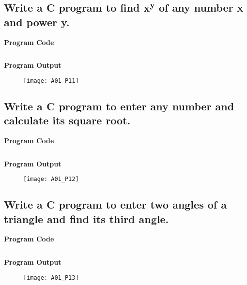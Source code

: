 \newpage



\subsection{Write a C program to find x\textsuperscript{y} of any number x and power y.}
\textbf{Program Code}

\inputminted{C}{programs/A01_P11.c}

\textbf{Program Output}

\begin{figure}[h]
  \texttt{[image: A01\_P11]}
\end{figure}

\newpage



\subsection{Write a C program to enter any number and calculate its square root.}
\textbf{Program Code}

\inputminted{C}{programs/A01_P12.c}

\textbf{Program Output}

\begin{figure}[h]
  \texttt{[image: A01\_P12]}
\end{figure}

\newpage



\subsection{Write a C program to enter two angles of a triangle and find its third angle.}
\textbf{Program Code}

\inputminted{C}{programs/A01_P13.c}

\textbf{Program Output}

\begin{figure}[h]
  \texttt{[image: A01\_P13]}
\end{figure}

\newpage



